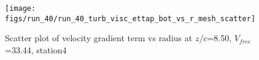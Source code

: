\begin{figure}[H]
\centering
\texttt{[image: figs/run\_40/run\_40\_turb\_visc\_ettap\_bot\_vs\_r\_mesh\_scatter]}
\caption{Scatter plot of velocity gradient term vs radius at $z/c$=8.50, $V_{free}$=33.44, station4}
\label{fig:run_40_turb_visc_ettap_bot_vs_r_mesh_scatter}
\end{figure}


